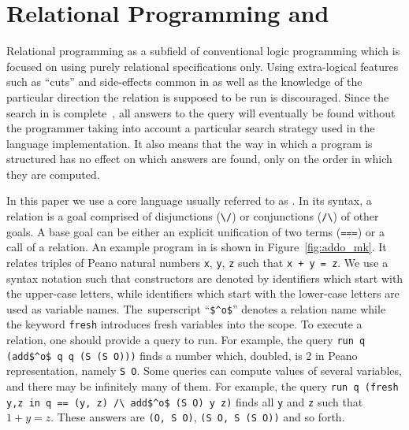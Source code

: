 \section{Relational Programming and \mk}
\label{sec:mk}










Relational programming as a subfield of conventional logic programming which is focused on using purely relational specifications only.
Using extra-logical features such as ``cuts'' and side-effects common in \prolog as well as the knowledge of the particular direction the relation is supposed to be run is discouraged.
Since the search in \mk is complete~\cite{kiselyov2005backtracking,rozplokhas2020certified}, all answers to the query will eventually be found without the programmer taking into account a particular search strategy used in the language implementation.
It also means that the way in which a program is structured has no effect on which answers are found, only on the order in which they are computed.

In this paper we use a core \mk language usually referred to as \micro.
In its syntax, a relation is a goal comprised of disjunctions (\lstinline{\/}) or conjunctions (\lstinline{/\}) of other goals.
A base goal can be either an explicit unification of two terms (\lstinline{===}) or a call of a relation.
An example program in \mk is shown in Figure~\ref{fig:addo_mk}.
It relates triples of Peano natural numbers \lstinline{x}, \lstinline{y}, \lstinline{z} such that \lstinline{x + y = z}.
We use a syntax notation such that constructors are denoted by identifiers which start with the upper-case letters, while identifiers which start with the lower-case letters are used as variable names.
The~superscript ``\lstinline{$^o$}'' denotes a relation name while the keyword \lstinline{fresh} introduces fresh variables into the scope.
To execute a relation, one should provide a query to run.
For example, the query \lstinline{run q (add$^o$ q q (S (S O)))} finds a number which, doubled, is 2 in Peano representation, namely \lstinline{S O}.
Some queries can compute values of several variables, and there may be infinitely many of them.
For example, the query \lstinline{run q (fresh y,z in q == (y, z) /\ add$^o$ (S O) y z)} finds all \lstinline{y} and \lstinline{z} such that $1 + y = z$.
These answers are \lstinline{(O, S O)}, \lstinline{(S O, S (S O))} and so forth.


